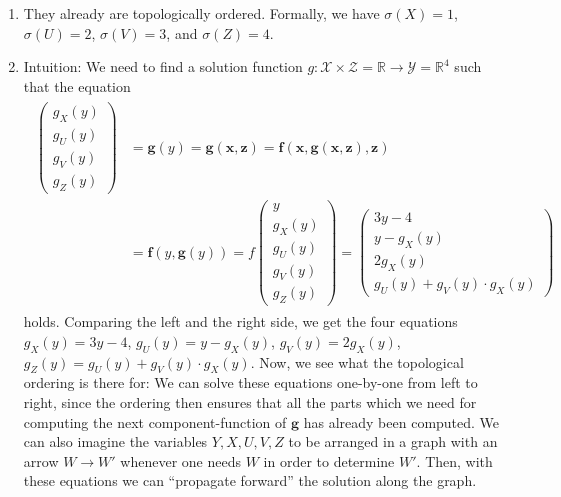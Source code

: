 \begin{enumerate}
\begin{enumerate}
\begin{gradedsolution}
\begin{enumerate}
\begin{equation}
		\label{eq:functional_equation}
	\end{equation}
	which we have already conveniently ordered. 
	\item They already are topologically ordered. Formally, we have $\sigma(X) = 1$, $\sigma(U) = 2$, $\sigma(V) = 3$, and $\sigma(Z) = 4$. 
	\item Intuition: We need to find a solution function $g: \boldsymbol{\mathcal{X}} \times \boldsymbol{\mathcal{Z}} = \mathbb{R} \to \boldsymbol{\mathcal{Y}} = \mathbb{R}^{4}$ such that the equation 
	\begin{align}
		\begin{split}
			\begin{pmatrix} g_X(y) \\ g_U(y) \\ g_V(y) \\ g_Z(y)\end{pmatrix} & = \boldsymbol{g}(y)  = \boldsymbol{g}(\boldsymbol{x}, \boldsymbol{z}) = \boldsymbol{f}(\boldsymbol{x}, \boldsymbol{g}(\boldsymbol{x}, \boldsymbol{z}), \boldsymbol{z}) 
			\\ &	  = \boldsymbol{f}(y, \boldsymbol{g}(y))  = 
			f \begin{pmatrix} y \\ g_X(y) \\ g_U(y) \\ g_V(y) \\ g_Z(y)\end{pmatrix} = \begin{pmatrix} 3y - 4 \\ y - g_X(y) \\ 2g_X(y) \\ g_U(y) + g_V(y) \cdot g_X(y)\end{pmatrix}
		\end{split}
		\label{eq:eq_constraint}
	\end{align}
	holds.
	Comparing the left and the right side, we get the four equations $g_X(y) = 3y - 4$, $g_U(y) = y - g_X(y)$, $g_V(y) = 2g_X(y)$, $g_Z(y) = g_U(y) + g_V(y) \cdot g_X(y)$.
	Now, we see what the topological ordering is there for: We can solve these equations one-by-one from left to right, since the ordering then ensures that all the parts which we need for computing the next component-function of $\boldsymbol{g}$ has already been computed.
	We can also imagine the variables $Y, X, U, V, Z$ to be arranged in a graph with an arrow $W \to W'$ whenever one needs $W$ in order to determine $W'$. Then, with these equations we can ``propagate forward'' the solution along the graph.

\end{enumerate}
\end{gradedsolution}
\end{enumerate}
\end{enumerate}
